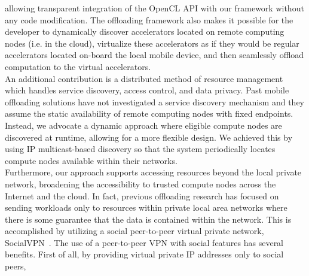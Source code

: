 \documentclass[10pt, conference, compsocconf]{IEEEtran}
\begin{document}
allowing transparent integration of the OpenCL API with our framework 
without any code modification.
%
The offloading framework also makes it possible for the developer to 
dynamically discover accelerators located on remote computing nodes 
(i.e. in the cloud), virtualize these accelerators as if they would be
regular accelerators located on-board the local mobile device, and then
seamlessly offload computation to the virtual accelerators.\\
%
%
%
%
\indent An additional contribution is a distributed method of resource management 
which handles service discovery, access control, and data privacy.
%
Past mobile offloading solutions have not investigated a service discovery 
mechanism and they assume the static availability of remote computing nodes 
with fixed endpoints.
%
Instead, we advocate a dynamic approach where eligible compute nodes are 
discovered at runtime, allowing for a more flexible design. 
%
We achieved this by using IP multicast-based discovery so that the
system periodically locates compute nodes available within their
networks.\\
%
\indent Furthermore, our approach supports accessing resources beyond the local
private network, broadening the accessibility to trusted compute nodes
across the Internet and the cloud.
%
In fact, previous offloading research has focused on sending workloads only to 
resources within private local area networks where there is some guarantee 
that the data is contained within the network.
%
%
This is accomplished by utilizing a social peer-to-peer virtual 
private network, SocialVPN~\cite{socialvpn}.
%
The use of a peer-to-peer VPN with social features has several benefits.
%
First of all, by providing virtual private IP addresses only to social peers, 
\end{document}
